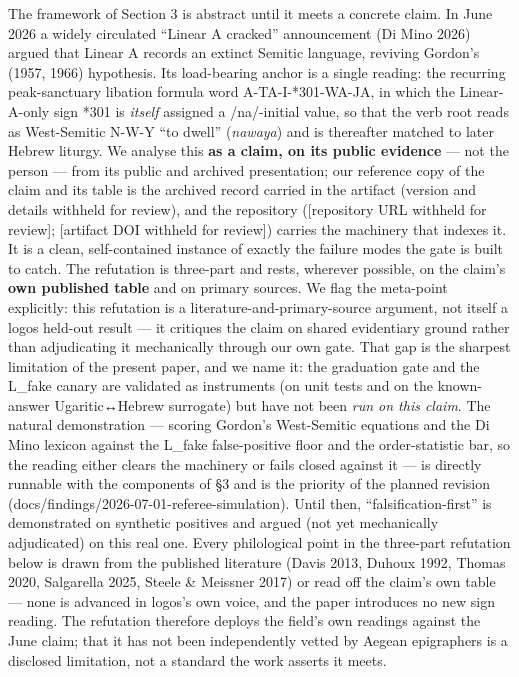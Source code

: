 \documentclass[
  10pt,
]{article}
\begin{document}
The framework of Section 3 is abstract until it meets a concrete claim.
In June 2026 a widely circulated ``Linear A cracked'' announcement (Di
Mino 2026) argued that Linear A records an extinct Semitic language,
reviving Gordon's (1957, 1966) hypothesis. Its load-bearing anchor is a
single reading: the recurring peak-sanctuary libation formula word
A-TA-I-*301-WA-JA, in which the Linear-A-only sign *301 is \emph{itself}
assigned a /na/-initial value, so that the verb root reads as
West-Semitic N-W-Y ``to dwell'' (\emph{nawaya}) and is thereafter
matched to later Hebrew liturgy. We analyse this \textbf{as a claim, on
its public evidence} --- not the person --- from its public and archived
presentation; our reference copy of the claim and its table is the
archived record carried in the artifact (version and details withheld
for review), and the repository ({[}repository URL withheld for
review{]}; {[}artifact DOI withheld for review{]}) carries the machinery
that indexes it. It is a clean, self-contained instance of exactly the
failure modes the gate is built to catch. The refutation is three-part
and rests, wherever possible, on the claim's \textbf{own published
table} and on primary sources. We flag the meta-point explicitly: this
refutation is a literature-and-primary-source argument, not itself a
logos held-out result --- it critiques the claim on shared evidentiary
ground rather than adjudicating it mechanically through our own gate.
That gap is the sharpest limitation of the present paper, and we name
it: the graduation gate and the L\_fake canary are validated as
instruments (on unit tests and on the known-answer Ugaritic↔Hebrew
surrogate) but have not been \emph{run on this claim}. The natural
demonstration --- scoring Gordon's West-Semitic equations and the Di
Mino lexicon against the L\_fake false-positive floor and the
order-statistic bar, so the reading either clears the machinery or fails
closed against it --- is directly runnable with the components of §3 and
is the priority of the planned revision
(docs/findings/2026-07-01-referee-simulation). Until then,
``falsification-first'' is demonstrated on synthetic positives and
argued (not yet mechanically adjudicated) on this real one. Every
philological point in the three-part refutation below is drawn from the
published literature (Davis 2013, Duhoux 1992, Thomas 2020, Salgarella
2025, Steele \& Meissner 2017) or read off the claim's own table ---
none is advanced in logos's own voice, and the paper introduces no new
sign reading. The refutation therefore deploys the field's own readings
against the June claim; that it has not been independently vetted by
Aegean epigraphers is a disclosed limitation, not a standard the work
asserts it meets.
\end{document}
